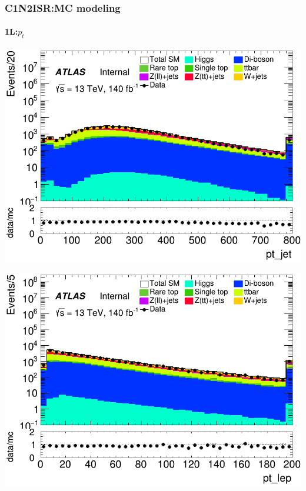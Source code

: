 \documentclass[usenames,dvipsnames]{beamer}
\begin{document}
\begin{frame}
\frametitle{C1N2ISR:MC modeling}
\framesubtitle{1L:\quad $p_t$}
    \begin{minipage}{0.32\textwidth}
        \centering
        \includegraphics[width=\textwidth]{graphics/L_met/L_met_pt_jet.png}
    \end{minipage}
    \hfill
    \begin{minipage}{0.32\textwidth}
        \centering
        \includegraphics[width=\textwidth]{graphics/L_met/L_met_pt_lep.png}
    \end{minipage}
    \hfill
    \begin{minipage}{0.32\textwidth}
        \centering

\end{minipage}
\end{frame}
\end{document}
